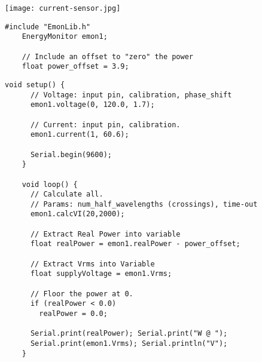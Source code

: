 \vspace{0.1in}
\begin{minipage}[t]{0.49\tw}

  \vspace{0.0in}
  \texttt{[image: current-sensor.jpg]}

  \vspace{0.0in}
  \begin{Verbatim}[gobble=3,fontsize=\small]
    #include "EmonLib.h"
    EnergyMonitor emon1;

    // Include an offset to "zero" the power
    float power_offset = 3.9;
  \end{Verbatim}

\end{minipage}
\hfill
\begin{minipage}[t]{0.49\tw}
  \vspace{0.1in}
  \begin{Verbatim}[gobble=3,fontsize=\small]
    void setup() {
      // Voltage: input pin, calibration, phase_shift
      emon1.voltage(0, 120.0, 1.7);

      // Current: input pin, calibration.
      emon1.current(1, 60.6);

      Serial.begin(9600);
    }

    void loop() {
      // Calculate all.
      // Params: num_half_wavelengths (crossings), time-out
      emon1.calcVI(20,2000);

      // Extract Real Power into variable
      float realPower = emon1.realPower - power_offset;

      // Extract Vrms into Variable
      float supplyVoltage = emon1.Vrms;

      // Floor the power at 0.
      if (realPower < 0.0)
        realPower = 0.0;

      Serial.print(realPower); Serial.print("W @ ");
      Serial.print(emon1.Vrms); Serial.println("V");
    }
  \end{Verbatim}
\end{minipage}

